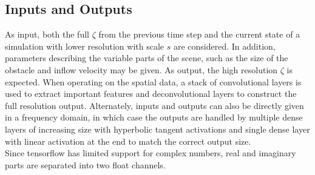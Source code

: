\documentclass[sigconf]{acmart}
\begin{document}
\subsection{Inputs and Outputs}
As input, both the full $\zeta$ from the previous time step and the current state of a simulation with lower resolution with scale $s$ are considered. 
In addition, parameters describing the variable parts of the scene, such as the size of the obstacle and inflow velocity may be given.
As output, the high resolution $\zeta$ is expected.
When operating on the spatial data, a stack of convolutional layers is used to extract important features and deconvolutional layers to construct the full resolution output. Alternately, inputs and outputs can also be directly given in a frequency domain, in which case the outputs are handled by multiple dense layers of increasing size with hyperbolic tangent activations and single dense layer with linear activation at the end to match the correct output size.\\
 Since tensorflow has limited support for complex numbers, real and imaginary parts are separated into two float channels.
\end{document}
